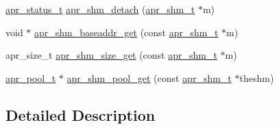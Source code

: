 \begin{DoxyCompactItemize}
\item 
\hyperlink{group__apr__errno_gaf76ee4543247e9fb3f3546203e590a6c}{apr\-\_\-status\-\_\-t} \hyperlink{group__apr__shm_ga900095a06d3fdb4cdd04ca4449a9d42a}{apr\-\_\-shm\-\_\-detach} (\hyperlink{group__apr__shm_ga79e8c16bdeaf7ade4ef0f935249e7c2f}{apr\-\_\-shm\-\_\-t} $\ast$m)
\item 
void $\ast$ \hyperlink{group__apr__shm_gade739e1f5f4e88c93256a63ebfd47d4d}{apr\-\_\-shm\-\_\-baseaddr\-\_\-get} (const \hyperlink{group__apr__shm_ga79e8c16bdeaf7ade4ef0f935249e7c2f}{apr\-\_\-shm\-\_\-t} $\ast$m)
\item 
apr\-\_\-size\-\_\-t \hyperlink{group__apr__shm_ga557ae85d3f225620a77ad80caeaacac7}{apr\-\_\-shm\-\_\-size\-\_\-get} (const \hyperlink{group__apr__shm_ga79e8c16bdeaf7ade4ef0f935249e7c2f}{apr\-\_\-shm\-\_\-t} $\ast$m)
\item 
\hyperlink{group__apr__pools_gaf137f28edcf9a086cd6bc36c20d7cdfb}{apr\-\_\-pool\-\_\-t} $\ast$ \hyperlink{group__apr__shm_ga072c40df7643e697885935ae65545098}{apr\-\_\-shm\-\_\-pool\-\_\-get} (const \hyperlink{group__apr__shm_ga79e8c16bdeaf7ade4ef0f935249e7c2f}{apr\-\_\-shm\-\_\-t} $\ast$theshm)
\end{DoxyCompactItemize}


\subsection{Detailed Description}


